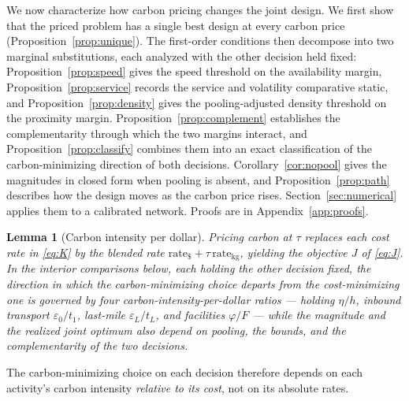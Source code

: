\documentclass[11pt]{article}
\newtheorem{lemma}[proposition]{Lemma}
\theoremstyle{definition}
\theoremstyle{remark}
\theoremstyle{plain}
\begin{document}
We now characterize how carbon pricing changes the joint design. We first show that the priced problem has
a single best design at every carbon price (Proposition~\ref{prop:unique}). The first-order conditions then
decompose into two marginal substitutions, each analyzed with the other decision held fixed:
Proposition~\ref{prop:speed} gives the speed threshold on the availability margin,
Proposition~\ref{prop:service} records the service and volatility comparative static, and
Proposition~\ref{prop:density} gives the pooling-adjusted density threshold on the proximity margin.
Proposition~\ref{prop:complement} establishes the complementarity through which the two margins interact, and
Proposition~\ref{prop:classify} combines them into an exact classification of the carbon-minimizing direction
of both decisions. Corollary~\ref{cor:nopool} gives the magnitudes in closed form when pooling is absent, and
Proposition~\ref{prop:path} describes how the design moves as the carbon price rises.
Section~\ref{sec:numerical} applies them to a calibrated network. Proofs are in Appendix~\ref{app:proofs}.

\begin{lemma}[Carbon intensity per dollar]\label{lem:blend}
Pricing carbon at $\tau$ replaces each cost rate in \eqref{eq:K} by the blended rate
$\mathrm{rate}_\$ + \tau\,\mathrm{rate}_{\mathrm{kg}}$, yielding the objective $J$ of \eqref{eq:J}. In the
interior comparisons below, each holding the other decision fixed, the \emph{direction} in which the carbon-minimizing choice departs
from the cost-minimizing one is governed by four carbon-intensity-per-dollar ratios --- holding $\eta/h$,
inbound transport $\varepsilon_0/t_1$, last-mile $\varepsilon_L/t_L$, and facilities $\varphi/F$ --- while the
magnitude and the realized joint optimum also depend on pooling, the bounds, and the complementarity of the
two decisions.
\end{lemma}

\noindent The carbon-minimizing choice on each decision therefore depends on each activity's carbon intensity
\emph{relative to its cost}, not on its absolute rates.
\end{document}

